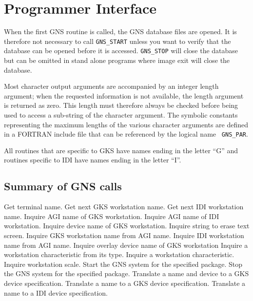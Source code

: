\newpage
\section{Programmer Interface}\label{prog}

When the first GNS routine is called, the GNS database files are opened. It is
therefore not necessary to call {\tt GNS\_START} unless you want to verify that
the database can be opened before it is accessed. {\tt GNS\_STOP} will close
the database but can be omitted in stand alone programs where image exit will
close the database.

Most character output arguments are accompanied by an integer length argument;
when the requested information is not available, the length argument is
returned as zero. This length must therefore always be checked before being
used to access a sub-string of the character argument. The symbolic constants
representing the maximum lengths of the various character arguments are defined 
in a FORTRAN include file that can be referenced by the logical name {\tt
GNS\_PAR}.

All routines that are specific to GKS have names ending in the letter ``G'' and
routines specific to IDI have names ending in the letter ``I''.

\subsection{Summary of GNS calls}

\begin{routinelist}
   Get terminal name.
   Get next GKS workstation name.
   Get next IDI workstation name.
   Inquire AGI name of GKS workstation.
   Inquire AGI name of IDI workstation.
   Inquire device name of GKS workstation.
   Inquire string to erase text screen.
   Inquire GKS workstation name from AGI name.
   Inquire IDI workstation name from AGI name.
   Inquire overlay device name of GKS workstation
   Inquire a workstation characteristic from its type.
   Inquire a workstation characteristic.
   Inquire workstation scale.
   Start the GNS system for the specified package.
   Stop the GNS system for the specified package.
   Translate a name and device to a GKS device specification.
   Translate a name to a GKS device specification.
   Translate a name to a IDI device specification.
\end{routinelist}

